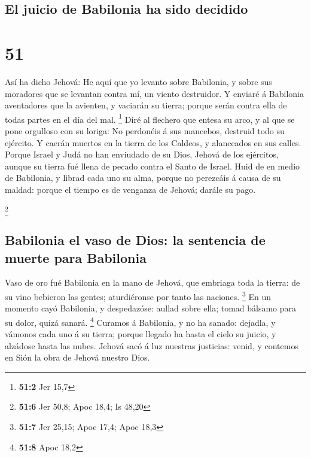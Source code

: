 \hypertarget{el-juicio-de-babilonia-ha-sido-decidido}{%
\subsection{El juicio de Babilonia ha sido
decidido}\label{el-juicio-de-babilonia-ha-sido-decidido}}

\hypertarget{section-50}{%
\section{51}\label{section-50}}

 Así ha dicho Jehová: He aquí que yo levanto sobre
Babilonia, y sobre sus moradores que se levantan contra mí, un viento
destruidor.  Y enviaré á Babilonia aventadores que la
avienten, y vaciarán su tierra; porque serán contra ella de todas partes
en el día del mal. \footnote{\textbf{51:2} Jer 15,7}  Diré
al flechero que entesa su arco, y al que se pone orgulloso con su
loriga: No perdonéis á sus mancebos, destruid todo su ejército.
 Y caerán muertos en la tierra de los Caldeos, y
alanceados en sus calles.  Porque Israel y Judá no han
enviudado de su Dios, Jehová de los ejércitos, aunque su tierra fué
llena de pecado contra el Santo de Israel.  Huid de en
medio de Babilonia, y librad cada uno su alma, porque no perezcáis á
causa de su maldad: porque el tiempo es de venganza de Jehová; darále su
pago.

\footnote{\textbf{51:6} Jer 50,8; Apoc 18,4; Is 48,20}

\hypertarget{babilonia-el-vaso-de-dios-la-sentencia-de-muerte-para-babilonia}{%
\subsection{Babilonia el vaso de Dios: la sentencia de muerte para
Babilonia}\label{babilonia-el-vaso-de-dios-la-sentencia-de-muerte-para-babilonia}}

 Vaso de oro fué Babilonia en la mano de Jehová, que
embriaga toda la tierra: de su vino bebieron las gentes; aturdiéronse
por tanto las naciones. \footnote{\textbf{51:7} Jer 25,15; Apoc 17,4;
  Apoc 18,3}  En un momento cayó Babilonia, y despedazóse:
aullad sobre ella; tomad bálsamo para su dolor, quizá sanará.
\footnote{\textbf{51:8} Apoc 18,2}  Curamos á Babilonia, y
no ha sanado: dejadla, y vámonos cada uno á su tierra; porque llegado ha
hasta el cielo su juicio, y alzádose hasta las nubes. 
Jehová sacó á luz nuestras justicias: venid, y contemos en Sión la obra
de Jehová nuestro Dios.

